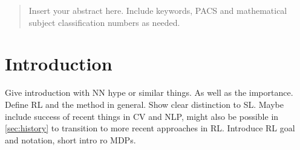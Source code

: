     \author{Fabian Otto
    }



    \date{Received: date / Accepted: date}


    \maketitle

    \begin{abstract}
        Insert your abstract here. Include keywords, PACS and mathematical
        subject classification numbers as needed.
    \end{abstract}

    \section{Introduction}
    \label{sec:intro}
    Give introduction with NN hype or similar things. As well as the importance.
    Define RL and the method in general.
    Show clear distinction to SL.
    Maybe include success of recent things in CV and NLP, might also be possible in \ref{sec:history} to transition to more recent approaches in RL. 
    Introduce RL goal and notation, short intro ro MDPs.
    
